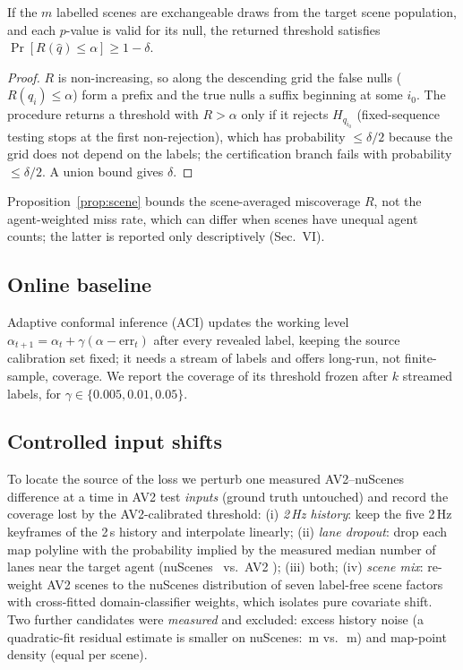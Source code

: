 \begin{proposition}\label{prop:scene}
If the $m$ labelled scenes are exchangeable draws from the target scene population, and each $p$-value is valid for its null, the returned
threshold satisfies $\Pr[R(\hat q)\le\alpha]\ge 1-\delta$.
\end{proposition}
\begin{proof}
$R$ is non-increasing, so along the descending grid the false nulls ($R(q_i)\le\alpha$) form a prefix and the true nulls a suffix beginning at some $i_0$.
The procedure returns a threshold with $R>\alpha$ only if it rejects $H_{q_{i_0}}$ (fixed-sequence testing stops at the first non-rejection), which has probability $\le\delta/2$
because the grid does not depend on the labels; the certification branch fails with probability $\le\delta/2$. A union bound gives $\delta$.
\end{proof}
\begin{remark}
Proposition~\ref{prop:scene} bounds the scene-averaged miscoverage $R$, not the agent-weighted miss rate, which can differ when scenes
have unequal agent counts; the latter is reported only descriptively (Sec.~VI).
\end{remark}

\subsection{Online baseline}
Adaptive conformal inference (ACI) \cite{gibbs2021adaptive} updates the working level $\alpha_{t+1}=\alpha_t+\gamma(\alpha-\mathrm{err}_t)$ after every revealed label, keeping the source
calibration set fixed; it needs a stream of labels and offers long-run, not finite-sample, coverage. We report the coverage of its threshold frozen after $k$ streamed labels, for $\gamma\in\{0.005,0.01,0.05\}$.

\subsection{Controlled input shifts}\label{sec:inject}
To locate the source of the loss we perturb one measured AV2--nuScenes difference at a time in AV2 test \emph{inputs} (ground truth untouched) and record the coverage lost by
the AV2-calibrated threshold: (i) \emph{2\,Hz history}: keep the five 2\,Hz keyframes of the 2\,s history and interpolate linearly; (ii) \emph{lane dropout}: drop each map polyline with the probability implied
by the measured median number of lanes near the target agent (nuScenes \lanesMedianNs\ vs.\ AV2 \lanesMedianAv); (iii) both; (iv) \emph{scene mix}: re-weight AV2 scenes to the nuScenes distribution of seven label-free scene
factors with cross-fitted domain-classifier weights, which isolates pure covariate shift. Two further candidates were \emph{measured} and excluded: excess history noise
(a quadratic-fit residual estimate is smaller on nuScenes: \noiseSigmaNs\,m vs.\ \noiseSigmaAv\,m) and map-point density (equal per scene).

